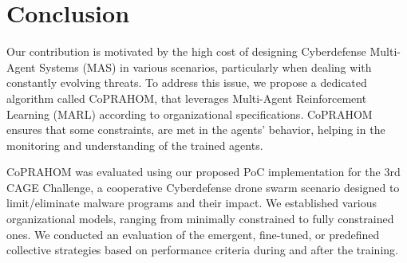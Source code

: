 \documentclass[conference]{IEEEtran}
\begin{document}


\section{Conclusion}\label{sec:conclusion}

Our contribution is motivated by the high cost of designing Cyberdefense Multi-Agent Systems (MAS) in various scenarios, particularly when dealing with constantly evolving threats. To address this issue, we propose a dedicated algorithm called CoPRAHOM, that leverages Multi-Agent Reinforcement Learning (MARL) according to organizational specifications. CoPRAHOM ensures that some constraints, are met in the agents' behavior, helping in the monitoring and understanding of the trained agents.

CoPRAHOM was evaluated using our proposed PoC implementation for the 3rd CAGE Challenge, a cooperative Cyberdefense drone swarm scenario designed to limit/eliminate malware programs and their impact. We established various organizational models, ranging from minimally constrained to fully constrained ones. We conducted an evaluation of the emergent, fine-tuned, or predefined collective strategies based on performance criteria during and after the training.
\end{document}

